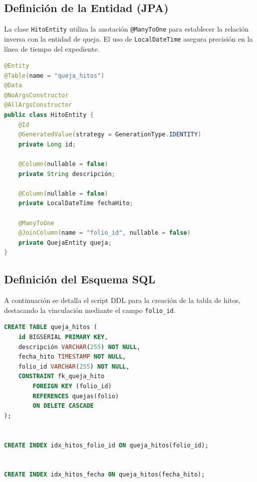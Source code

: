 \subsection{Definici\'on de la Entidad (JPA)}
La clase \texttt{HitoEntity} utiliza la anotaci\'on \texttt{@ManyToOne} para establecer la relaci\'on inversa con la entidad de queja. El uso de \texttt{LocalDateTime} asegura precisi\'on en la l\'inea de tiempo del expediente.

\begin{lstlisting}[language=Java, caption={Entidad Java para el registro de hitos de seguimiento.}, label={lst:java_hito}]
@Entity
@Table(name = "queja_hitos")
@Data
@NoArgsConstructor
@AllArgsConstructor
public class HitoEntity {
    @Id
    @GeneratedValue(strategy = GenerationType.IDENTITY)
    private Long id;

    @Column(nullable = false)
    private String descripción; 
    
    @Column(nullable = false)
    private LocalDateTime fechaHito;

    @ManyToOne
    @JoinColumn(name = "folio_id", nullable = false)
    private QuejaEntity queja;
}
\end{lstlisting}

\subsection{Definici\'on del Esquema SQL}
A continuaci\'on se detalla el script DDL para la creaci\'on de la tabla de hitos, destacando la vinculaci\'on mediante el campo \texttt{folio\_id}.

\begin{lstlisting}[language=SQL, caption={Script de creaci\'on para la tabla de hitos de seguimiento.}, label={lst:sql_hitos}]
CREATE TABLE queja_hitos (
    id BIGSERIAL PRIMARY KEY,
    descripción VARCHAR(255) NOT NULL,
    fecha_hito TIMESTAMP NOT NULL,
    folio_id VARCHAR(255) NOT NULL,
    CONSTRAINT fk_queja_hito 
        FOREIGN KEY (folio_id) 
        REFERENCES quejas(folio) 
        ON DELETE CASCADE
);


CREATE INDEX idx_hitos_folio_id ON queja_hitos(folio_id);


CREATE INDEX idx_hitos_fecha ON queja_hitos(fecha_hito);
\end{lstlisting}


